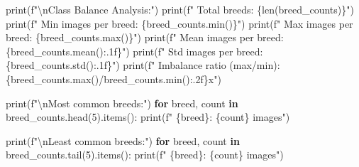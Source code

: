 \documentclass[
  letterpaper,
  DIV=11,
  numbers=noendperiod]{scrartcl}
\newenvironment{Shaded}{\begin{snugshade}}{\end{snugshade}}
\newcommand{\BuiltInTok}[1]{\textcolor[rgb]{0.00,0.23,0.31}{#1}}
\newcommand{\CharTok}[1]{\textcolor[rgb]{0.13,0.47,0.30}{#1}}
\newcommand{\ControlFlowTok}[1]{\textcolor[rgb]{0.00,0.23,0.31}{\textbf{#1}}}
\newcommand{\DecValTok}[1]{\textcolor[rgb]{0.68,0.00,0.00}{#1}}
\newcommand{\KeywordTok}[1]{\textcolor[rgb]{0.00,0.23,0.31}{\textbf{#1}}}
\newcommand{\NormalTok}[1]{\textcolor[rgb]{0.00,0.23,0.31}{#1}}
\newcommand{\OperatorTok}[1]{\textcolor[rgb]{0.37,0.37,0.37}{#1}}
\newcommand{\SpecialCharTok}[1]{\textcolor[rgb]{0.37,0.37,0.37}{#1}}
\newcommand{\SpecialStringTok}[1]{\textcolor[rgb]{0.13,0.47,0.30}{#1}}
\renewenvironment{Shaded}{%
  \begin{tcolorbox}[%
    enhanced,%
    colback=codebg,%
    colframe=codebg,%
    borderline west={3pt}{0pt}{sectionblue},%
    boxrule=0pt,%
    arc=0pt,%
    boxsep=5pt,%
    left=2mm,%
    right=2mm,%
    top=2mm,%
    bottom=2mm%
  ]%
}{%
  \end{tcolorbox}%
}
\begin{document}
\begin{Shaded}
\begin{Highlighting}[]
\BuiltInTok{print}\NormalTok{(}\SpecialStringTok{f"}\CharTok{\textbackslash{}n}\SpecialStringTok{Class Balance Analysis:"}\NormalTok{)}
\BuiltInTok{print}\NormalTok{(}\SpecialStringTok{f"  Total breeds: }\SpecialCharTok{\{}\BuiltInTok{len}\NormalTok{(breed\_counts)}\SpecialCharTok{\}}\SpecialStringTok{"}\NormalTok{)}
\BuiltInTok{print}\NormalTok{(}\SpecialStringTok{f"  Min images per breed: }\SpecialCharTok{\{}\NormalTok{breed\_counts}\SpecialCharTok{.}\BuiltInTok{min}\NormalTok{()}\SpecialCharTok{\}}\SpecialStringTok{"}\NormalTok{)}
\BuiltInTok{print}\NormalTok{(}\SpecialStringTok{f"  Max images per breed: }\SpecialCharTok{\{}\NormalTok{breed\_counts}\SpecialCharTok{.}\BuiltInTok{max}\NormalTok{()}\SpecialCharTok{\}}\SpecialStringTok{"}\NormalTok{)}
\BuiltInTok{print}\NormalTok{(}\SpecialStringTok{f"  Mean images per breed: }\SpecialCharTok{\{}\NormalTok{breed\_counts}\SpecialCharTok{.}\NormalTok{mean()}\SpecialCharTok{:.1f\}}\SpecialStringTok{"}\NormalTok{)}
\BuiltInTok{print}\NormalTok{(}\SpecialStringTok{f"  Std images per breed: }\SpecialCharTok{\{}\NormalTok{breed\_counts}\SpecialCharTok{.}\NormalTok{std()}\SpecialCharTok{:.1f\}}\SpecialStringTok{"}\NormalTok{)}
\BuiltInTok{print}\NormalTok{(}\SpecialStringTok{f"  Imbalance ratio (max/min): }\SpecialCharTok{\{}\NormalTok{breed\_counts}\SpecialCharTok{.}\BuiltInTok{max}\NormalTok{()}\OperatorTok{/}\NormalTok{breed\_counts}\SpecialCharTok{.}\BuiltInTok{min}\NormalTok{()}\SpecialCharTok{:.2f\}}\SpecialStringTok{x"}\NormalTok{)}

\BuiltInTok{print}\NormalTok{(}\SpecialStringTok{f"}\CharTok{\textbackslash{}n}\SpecialStringTok{Most common breeds:"}\NormalTok{)}
\ControlFlowTok{for}\NormalTok{ breed, count }\KeywordTok{in}\NormalTok{ breed\_counts.head(}\DecValTok{5}\NormalTok{).items():}
    \BuiltInTok{print}\NormalTok{(}\SpecialStringTok{f"  }\SpecialCharTok{\{}\NormalTok{breed}\SpecialCharTok{\}}\SpecialStringTok{: }\SpecialCharTok{\{}\NormalTok{count}\SpecialCharTok{\}}\SpecialStringTok{ images"}\NormalTok{)}
    
\BuiltInTok{print}\NormalTok{(}\SpecialStringTok{f"}\CharTok{\textbackslash{}n}\SpecialStringTok{Least common breeds:"}\NormalTok{)}
\ControlFlowTok{for}\NormalTok{ breed, count }\KeywordTok{in}\NormalTok{ breed\_counts.tail(}\DecValTok{5}\NormalTok{).items():}
    \BuiltInTok{print}\NormalTok{(}\SpecialStringTok{f"  }\SpecialCharTok{\{}\NormalTok{breed}\SpecialCharTok{\}}\SpecialStringTok{: }\SpecialCharTok{\{}\NormalTok{count}\SpecialCharTok{\}}\SpecialStringTok{ images"}\NormalTok{)}
\end{Highlighting}
\end{Shaded}
\end{document}
